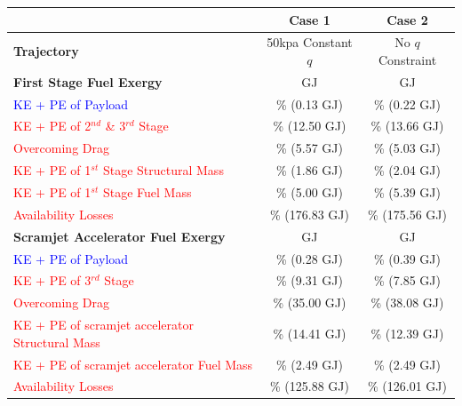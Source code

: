 \begin{table}[ht] %
	\centering
	\begin{tabular}{l c c} 
		& \textbf{Case 1} & \textbf{Case 2} \\
		\hline \textbf{Trajectory}
		& 50kpa Constant $q$
		& No $q$ Constraint
		\\
		\textbf{First Stage Fuel Exergy} 
		&\textbf{\firstEnergyConstqNoReturn} GJ
		&\textbf{\firstEnergyStandardNoReturn} GJ
		\\
		
		\textcolor{blue}{KE + PE of Payload}
		& \firstWpayloadConstqNoReturn \% (0.13 GJ)
		& \firstWpayloadStandardNoReturn \% (0.22 GJ)
		\\
		\textcolor{red}{KE + PE of  2$^{nd}$ \& 3$^{rd}$ Stage}
		& \firstWnextStageConstqNoReturn \% (12.50 GJ) & \firstWnextStageStandardNoReturn \% (13.66 GJ)
		\\
		
		\textcolor{red}{Overcoming Drag} 
		& \WDoneConstqNoReturn \% (5.57 GJ) & \WDoneStandardNoReturn \% (5.03 GJ)
		\\
		\textcolor{red}{KE + PE of 1$^{st}$ Stage Structural Mass} 
		& \WoneConstqNoReturn \% (1.86 GJ) & \WoneStandardNoReturn \% (2.04 GJ)
		\\ 
		\textcolor{red}{KE + PE of 1$^{st}$ Stage Fuel Mass} 
		& \WmFoneConstqNoReturn \% (5.00 GJ) & \WmFoneStandardNoReturn \% (5.39 GJ)
		\\ 
		\textcolor{red}{Availability Losses}  
		& \PlossoneConstqNoReturn \% (176.83 GJ) & \PlossoneStandardNoReturn \% (175.56 GJ)
		\\ 
		\textbf{Scramjet Accelerator Fuel Exergy} 
		& \textbf{\secondEnergyConstqNoReturn} GJ & \textbf{\secondEnergyStandardNoReturn} GJ
		\\
		\textcolor{blue}{KE + PE of Payload}
		& \secondWpayloadConstqNoReturn \% (0.28 GJ) & \secondWpayloadStandardNoReturn \% (0.39 GJ) 
		\\
		\textcolor{red}{KE + PE of 3$^{rd}$ Stage}
		& \secondWnextStageConstqNoReturn \% (9.31 GJ) & \secondWnextStageStandardNoReturn \% (7.85 GJ)
		\\
		\textcolor{red}{Overcoming Drag}
		& \WDsecondConstqNoReturn \% (35.00 GJ) & \WDsecondStandardNoReturn \% (38.08 GJ)
		\\
		\textcolor{red}{KE + PE of scramjet accelerator Structural Mass}  
		& \WsecondConstqNoReturn \% (14.41 GJ) & \WsecondStandardNoReturn \% (12.39 GJ)
		\\
		\textcolor{red}{KE + PE of scramjet accelerator Fuel Mass}  
		& \WmFsecondConstqNoReturn \% (2.49 GJ) & \WmFsecondStandardNoReturn \% (2.49 GJ)
		\\
		\textcolor{red}{Availability Losses}  
		& \PlosssecondConstqNoReturn \% (125.88 GJ) & \PlosssecondStandardNoReturn \% (126.01 GJ)
		\\
		

\end{tabular}
\end{table}
